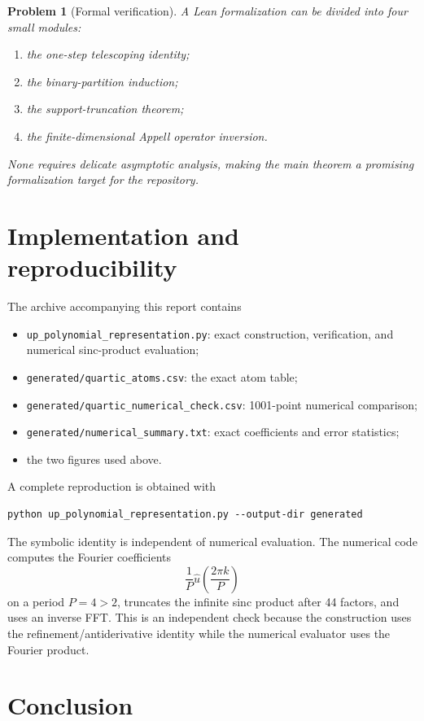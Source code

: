 \documentclass[11pt]{article}
\newtheorem{problem}[theorem]{Problem}
\theoremstyle{definition}
\theoremstyle{remark}
\newcommand{\1}{\mathbf{1}}
\begin{document}
\begin{problem}[Formal verification]
A Lean formalization can be divided into four small modules:
\begin{enumerate}
\item the one-step telescoping identity;
\item the binary-partition induction;
\item the support-truncation theorem;
\item the finite-dimensional Appell operator inversion.
\end{enumerate}
None requires delicate asymptotic analysis, making the main theorem a promising
formalization target for the repository.
\end{problem}

\section{Implementation and reproducibility}

The archive accompanying this report contains
\begin{itemize}
\item \texttt{up\_polynomial\_representation.py}: exact construction,
  verification, and numerical sinc-product evaluation;
\item \texttt{generated/quartic\_atoms.csv}: the exact atom table;
\item \texttt{generated/quartic\_numerical\_check.csv}: 1001-point numerical
  comparison;
\item \texttt{generated/numerical\_summary.txt}: exact coefficients and error
  statistics;
\item the two figures used above.
\end{itemize}

A complete reproduction is obtained with
\begin{lstlisting}[style=pythonstyle]
python up_polynomial_representation.py --output-dir generated
\end{lstlisting}
The symbolic identity is independent of numerical evaluation.  The numerical
code computes the Fourier coefficients
\[
 \frac1P\widehat u\!\left(\frac{2\pi k}{P}\right)
\]
on a period $P=4>2$, truncates the infinite sinc product after 44 factors, and
uses an inverse FFT.  This is an independent check because the construction
uses the refinement/antiderivative identity while the numerical evaluator uses
the Fourier product.

\section{Conclusion}
\end{document}
